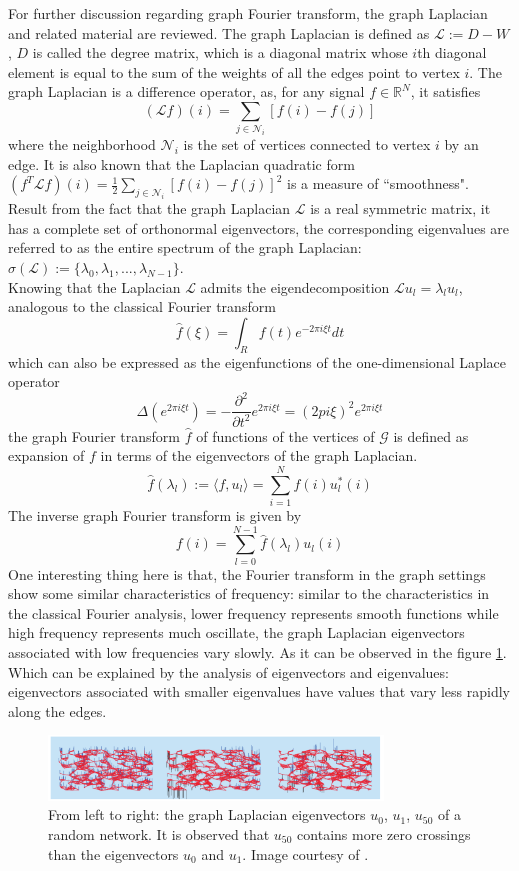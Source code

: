 \documentclass[conference]{IEEEtran}
\begin{document}
For further discussion regarding graph Fourier transform, the graph Laplacian and related material are reviewed. The graph Laplacian is defined as $\mathcal{L}:=D-W$, $D$ is called the degree matrix, which is a diagonal matrix whose $i$th diagonal element is equal to the sum of the weights of all the edges point to vertex $i$. The graph Laplacian is a difference operator, as, for any signal $f\in \mathbb{R}^N$, it satisfies
$$(\mathcal{L}f)(i)=\sum_{j\in\mathcal{N}_i}[f(i)-f(j)]$$
where the neighborhood $\mathcal{N}_i$ is the set of vertices connected to vertex $i$ by an edge. It is also known that the Laplacian quadratic form $(f^T\mathcal{L}f)(i)=\frac{1}{2}\sum_{j\in\mathcal{N}_i}[f(i)-f(j)]^2$ is a measure of ``smoothness".\\ 
Result from the fact that the graph Laplacian $\mathcal{L}$ is a real symmetric matrix, it has a complete set of orthonormal eigenvectors, the corresponding eigenvalues are referred to as the entire spectrum of the graph Laplacian: $\sigma(\mathcal{L}):=\{\lambda_0, \lambda_1, ..., \lambda_{N-1}\}$.\\
Knowing that the Laplacian $\mathcal{L}$ admits the eigendecomposition $\mathcal{L}u_{l}=\lambda_lu_l$, analogous to the classical Fourier transform
$$\hat{f}(\xi)=\int_Rf(t)e^{-2\pi i\xi t}dt$$
which can also be expressed as the eigenfunctions of the one-dimensional Laplace operator
$$\Delta(e^{2\pi i\xi t})=-\displaystyle\frac{\partial^2}{\partial t^2}e^{2\pi i \xi t} = (2pi\xi)^2e^{2\pi i\xi t}$$
the graph Fourier transform $\hat{f}$ of functions of the vertices of $\mathcal{G}$ is defined as expansion of $f$ in terms of the eigenvectors of the graph Laplacian. 
$$\hat{f}(\lambda_{l}):=\langle f, u_l\rangle=\sum_{i=1}^Nf(i)u_l^*(i)$$
The inverse graph Fourier transform is given by
$$f(i)=\sum_{l=0}^{N-1}\hat{f}(\lambda_l)u_l(i)$$
One interesting thing here is that, the Fourier transform in the graph settings show some similar characteristics of frequency: similar to the characteristics in the classical Fourier analysis, lower frequency represents smooth functions while high frequency represents much oscillate, the graph Laplacian eigenvectors associated with low frequencies vary slowly. As it can be observed in the figure \ref{2}. Which can be explained by the analysis of eigenvectors and eigenvalues: eigenvectors associated with smaller eigenvalues have values that vary less rapidly along the edges.
\begin{figure}[htbp]
\centerline{\includegraphics[width=3.5in]{2.png}}
\caption{From left to right: the graph Laplacian eigenvectors $u_0$, $u_1$, $u_{50}$ of a random network. It is observed that $u_{50}$ contains more zero crossings than the eigenvectors $u_0$ and $u_1$. Image courtesy of \cite{shuman2013emerging}.}
\label{2}
\end{figure}
\end{document}
